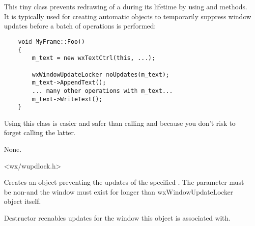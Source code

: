 
\section{}\label{wxwindowupdatelocker}

This tiny class prevents redrawing of a  during its
lifetime by using  and 
 methods. It is typically used for creating
automatic objects to temporarily suppress window updates before a batch of
operations is performed:
{\small
\begin{verbatim}
    void MyFrame::Foo()
    {
        m_text = new wxTextCtrl(this, ...);

        wxWindowUpdateLocker noUpdates(m_text);
        m_text->AppendText();
        ... many other operations with m_text...
        m_text->WriteText();
    }
\end{verbatim}
}

Using this class is easier and safer than calling 
 and  because you
don't risk to forget calling the latter.


None.


<wx/wupdlock.h>



\label{wxwindowupdatelockerctor}


Creates an object preventing the updates of the specified . The
parameter must be non-\NULL and the window must exist for longer than
wxWindowUpdateLocker object itself.


\label{wxwindowupdatelockerdtor}


Destructor reenables updates for the window this object is associated with.


